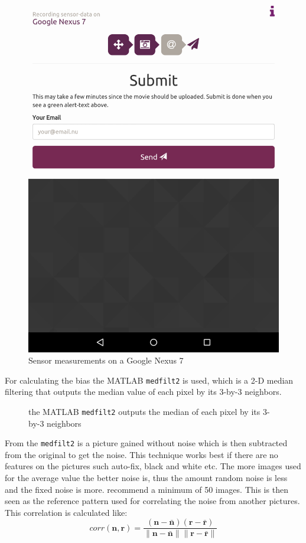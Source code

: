 \begin{figure}[h!]
\begin{minipage}[c]{.23\textwidth}
    \includegraphics[scale=0.15]{img/sensorrec-nexus-4-send}
  \end{minipage}
  \caption{Sensor measurements on a Google Nexus 7}\label{fig:sensorrecCamera}
\end{figure}

For calculating the bias the MATLAB \texttt{medfilt2} is used, which is a 2-D median filtering that outputs the median value of each pixel by its 3-by-3 neighbors. 
\begin{figure}[H]
  \centering
  
  \caption{\label{fig:medfilt2} the MATLAB \texttt{medfilt2} outputs the median of each pixel by its 3-by-3 neighbors}
\end{figure}
From the \texttt{medfilt2} is a picture gained without noise which is then subtracted from the original to get the noise. This technique works best if there are no features on the pictures such auto-fix, black and white etc. The more images used for the average value the better noise is, thus the amount random noise is less and the fixed noise is more. \cite[]{sensor:camera:DCIdent} recommend a minimum of 50 images. This is then seen as the reference pattern used for correlating the noise from another pictures. This correlation is calculated like:
$$
corr(\boldsymbol{n},\boldsymbol{r}) = 
\frac{(\boldsymbol{n} - \bar{\boldsymbol{n}})(\boldsymbol{r} - \bar{\boldsymbol{r}})}
{\|\boldsymbol{n} - \bar{\boldsymbol{n}}\| \|\boldsymbol{r} - \bar{\boldsymbol{r}}\|}
$$
\cite[]{sensor:camera:DCIdent}
